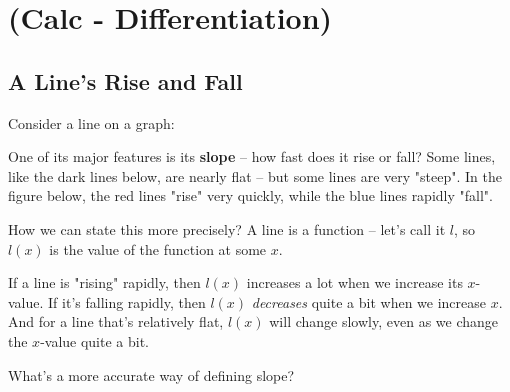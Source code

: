 
\chapter{(Calc - Differentiation)}










\section{A Line's Rise and Fall}


Consider a line on a graph:


One of its major features is its \textbf{slope} -- how fast does it rise or fall? Some lines, like the dark lines below, are nearly flat -- but some lines are very "steep". In the figure below, the red lines "rise" very quickly, while the blue lines rapidly "fall".


How we can state this more precisely? A line is a function -- let's call it $l$, so $l(x)$ is the value of the function at some $x$.

If a line is "rising" rapidly, then $l(x)$ increases a lot when we increase its $x$-value. If it's falling rapidly, then $l(x)$ \textit{decreases} quite a bit when we increase $x$. And for a line that's relatively flat, $l(x)$ will change slowly, even as we change the $x$-value quite a bit.



What's a more accurate way of defining slope? 

